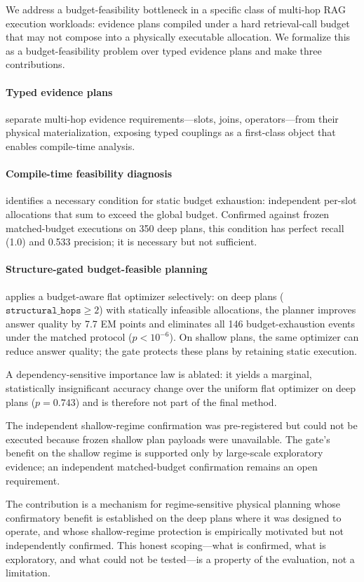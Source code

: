 We address a budget-feasibility bottleneck in a specific class of multi-hop RAG execution workloads: evidence plans compiled under a hard retrieval-call budget that may not compose into a physically executable allocation. We formalize this as a budget-feasibility problem over typed evidence plans and make three contributions.

\paragraph{Typed evidence plans} separate multi-hop evidence requirements---slots, joins, operators---from their physical materialization, exposing typed couplings as a first-class object that enables compile-time analysis.

\paragraph{Compile-time feasibility diagnosis} identifies a necessary condition for static budget exhaustion: independent per-slot allocations that sum to exceed the global budget. Confirmed against frozen matched-budget executions on 350 deep plans, this condition has perfect recall (1.0) and 0.533 precision; it is necessary but not sufficient.

\paragraph{Structure-gated budget-feasible planning} applies a budget-aware flat optimizer selectively: on deep plans ($\texttt{structural\_hops} \geq 2$) with statically infeasible allocations, the planner improves answer quality by 7.7 EM points and eliminates all 146 budget-exhaustion events under the matched protocol ($p < 10^{-6}$). On shallow plans, the same optimizer can reduce answer quality; the gate protects these plans by retaining static execution.

A dependency-sensitive importance law is ablated: it yields a marginal, statistically insignificant accuracy change over the uniform flat optimizer on deep plans ($p = 0.743$) and is therefore not part of the final method.

The independent shallow-regime confirmation was pre-registered but could not be executed because frozen shallow plan payloads were unavailable. The gate's benefit on the shallow regime is supported only by large-scale exploratory evidence; an independent matched-budget confirmation remains an open requirement.

The contribution is a mechanism for regime-sensitive physical planning whose confirmatory benefit is established on the deep plans where it was designed to operate, and whose shallow-regime protection is empirically motivated but not independently confirmed. This honest scoping---what is confirmed, what is exploratory, and what could not be tested---is a property of the evaluation, not a limitation.
